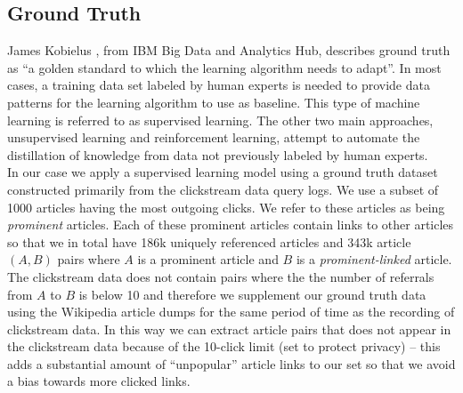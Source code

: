\subsection{Ground Truth}

James Kobielus \cite{kobielus}, from IBM Big Data and Analytics Hub, describes ground truth as ``a golden standard to which the learning algorithm needs to adapt''. In most cases, a training data set labeled by human experts is needed to provide data patterns for the learning algorithm to use as baseline. This type of machine learning is referred to as supervised learning. The other two main approaches, unsupervised learning and reinforcement learning, attempt to automate the distillation of knowledge from data not previously labeled by human experts. \\

In our case we apply a supervised learning model using a ground truth dataset constructed primarily from the clickstream data query logs. We use a subset of 1000 articles having the most outgoing clicks. We refer to these articles as being \textit{prominent} articles. Each of these prominent articles contain links to other articles so that we in total have  186k uniquely referenced articles and 343k article  $(A,B)$ pairs where $A$ is a prominent article and $B$ is a \textit{prominent-linked} article. \\

The clickstream data does not contain pairs where the the number of referrals from $A$ to $B$ is below 10 and therefore we supplement our ground truth data using the Wikipedia article dumps for the same period of time as the recording of clickstream data. In this way we can extract article pairs that does not appear in the clickstream data because of the 10-click limit (set to protect privacy) -- this adds a substantial amount of ``unpopular'' article links to our set so that we avoid a bias towards more clicked links.  \\